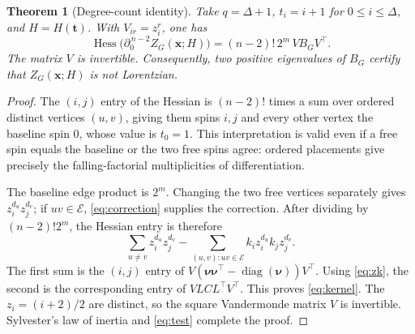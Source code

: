 \documentclass[11pt]{article}
\newtheorem{theorem}{Theorem}
\theoremstyle{remark}
\DeclareMathOperator{\Hess}{Hess}
\DeclareMathOperator{\diag}{diag}
\newcommand{\bnu}{\boldsymbol{\nu}}
\newcommand{\dd}{\partial}
\begin{document}
\begin{theorem}[Degree-count identity]\label{thm:kernel}
Take $q=\Delta+1$, $t_i=i+1$ for $0\leq i\leq\Delta$, and
$H=H(\mathbf t)$. With $V_{ir}=z_i^r$, one has
\begin{equation}
 \Hess\bigl(\dd_0^{\,n-2}Z_G(\mathbf x;H)\bigr)
 =(n-2)!\,2^m\,V B_G V^\top.                          \label{eq:kernel}
\end{equation}
The matrix $V$ is invertible. Consequently, two positive eigenvalues
of $B_G$ certify that $Z_G(\mathbf x;H)$ is not Lorentzian.
\end{theorem}
\begin{proof}
The $(i,j)$ entry of the Hessian is $(n-2)!$ times a sum over ordered
distinct vertices $(u,v)$, giving them spins $i,j$ and every other
vertex the baseline spin $0$, whose value is $t_0=1$.
This interpretation is valid even if a free spin equals the baseline
or the two free spins agree: ordered placements give precisely the
falling-factorial multiplicities of differentiation.

The baseline edge product is $2^m$. Changing the two free vertices
separately gives $z_i^{d_u}z_j^{d_v}$; if $uv\in\mathcal{E}$,
\eqref{eq:correction} supplies the correction. After dividing by
$(n-2)!2^m$, the Hessian entry is therefore
\[
 \sum_{u\ne v}z_i^{d_u}z_j^{d_v}
 -\sum_{(u,v):uv\in\mathcal{E}} k_i z_i^{d_u} k_j z_j^{d_v}.
\]
The first sum is the $(i,j)$ entry of
$V(\bnu\bnu^\top-\diag(\bnu))V^\top$.
Using \eqref{eq:zk}, the second is the corresponding entry of
$VLCL^\top V^\top$. This proves \eqref{eq:kernel}.
The $z_i=(i+2)/2$ are distinct, so the square Vandermonde matrix $V$
is invertible. Sylvester's law of inertia and \eqref{eq:test}
complete the proof.
\end{proof}
\end{document}
